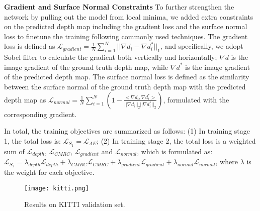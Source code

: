 \documentclass[letterpaper]{article} \usepackage{aaai20}  \usepackage{times}  \usepackage{helvet} \usepackage{courier}  \usepackage{graphicx} \frenchspacing  \setlength{\pdfpagewidth}{8.5in}  \setlength{\pdfpageheight}{11in}  \usepackage{epsfig}
\begin{document}
    \textbf{Gradient and Surface Normal Constraints} \hspace{0.3cm} To further strengthen the network by pulling out the model from local minima, we added extra constraints on the predicted depth map including the gradient loss and the surface normal loss to finetune the training following commonly used techniques. The gradient loss is defined as $\mathcal{L}_{gradient} = \frac{1}{N}\sum_{i=1}^N ||\nabla d_i - \nabla d_i^* ||_1$, and specifically, we adopt Sobel filter to calculate the gradient both vertically and horizontally; $\nabla d$ is the image gradient of the ground truth depth map, while $\nabla d^*$ is the image gradient of the predicted depth map. 
    The surface normal loss is defined as the similarity between the surface normal of the ground truth depth map with the predicted depth map as $\mathcal{L}_{normal} = \frac{1}{N} \sum_{i=1}^N {( 1 - {\frac{<\nabla d_i, \nabla d_i^*>}{||\nabla d_i||_2 ||\nabla d_i^*||_2}})}$, formulated with the corresponding gradient. 
    
    In total, the training objectives are summarized as follows: (1) In training stage 1, the total loss is:
    $\mathcal{L}_{S_1} = \mathcal{L}_{AE}$; (2) In training stage 2, the total loss is a weighted sum of $\mathcal{L}_{depth}$, $\mathcal{L}_{CMRC}$, $\mathcal{L}_{gradient}$ and $\mathcal{L}_{normal}$, which is formulated as: $\mathcal{L}_{S_2} = \lambda_{depth}\mathcal{L}_{depth} + \lambda_{CMRC}\mathcal{L}_{CMRC} + \lambda_{gradient}\mathcal{L}_{gradient} + \lambda_{normal} \mathcal{L}_{normal}$, where $\lambda$ is the weight for each objective.
    
    \begin{figure*}[t]
    \begin{center}
    \texttt{[image: kitti.png]}
    \end{center}
       \vspace{-12pt}
       \caption{Results on KITTI validation set.}
    \label{fig:kitti}
    \vspace{-8pt}
    \end{figure*}
    
\end{document}
